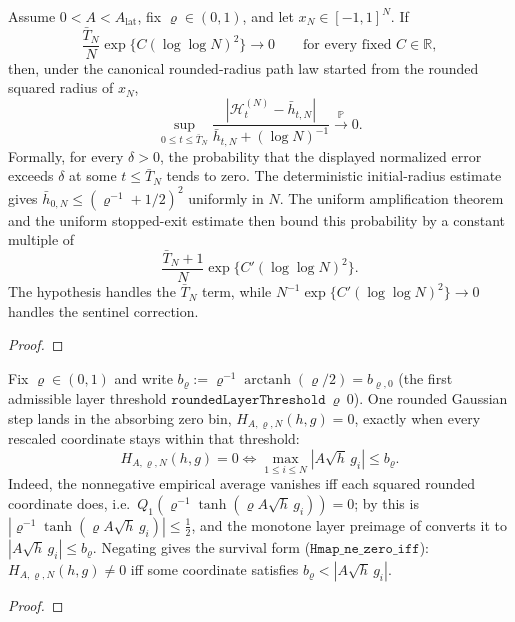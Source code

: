 \begin{proposition}
  \label{prop:subcritical-exact-radius-concentration}
  \leanok
  Assume $0<A<A_{\mathrm{lat}}$, fix $\varrho\in(0,1)$, and let
  $x_N\in[-1,1]^N$.  If
  \[
    \frac{\bar T_N}{N}\exp\{C(\log\log N)^2\}\longrightarrow0
    \qquad\text{for every fixed }C\in\mathbb R,
  \]
  then, under the canonical rounded-radius path law started from the rounded
  squared radius of $x_N$,
  \[
    \sup_{0\leq t\leq\bar T_N}
    \frac{|\mathscr H_t^{(N)}-\bar h_{t,N}|}
      {\bar h_{t,N}+(\log N)^{-1}}
    \xrightarrow{\mathbb P}0.
  \]
  Formally, for every $\delta>0$, the probability that the displayed
  normalized error exceeds $\delta$ at some $t\leq\bar T_N$ tends to zero.
  The deterministic initial-radius estimate gives
  $\bar h_{0,N}\leq(\varrho^{-1}+1/2)^2$ uniformly in $N$.  The uniform
  amplification theorem and the uniform stopped-exit estimate then bound this
  probability by a constant multiple of
  \[
    \frac{\bar T_N+1}{N}
      \exp\{C'(\log\log N)^2\}.
  \]
  The hypothesis handles the $\bar T_N$ term, while
  $N^{-1}\exp\{C'(\log\log N)^2\}\to0$ handles the sentinel correction.
\end{proposition}
\begin{proof}
  \leanok
\end{proof}

\begin{lemma}
  \label{lem:subcritical-exact-zero-bin}
  \leanok
  Fix $\varrho\in(0,1)$ and write
  $b_\varrho:=\varrho^{-1}\operatorname{arctanh}(\varrho/2)=
  b_{\varrho,0}$ (the first admissible layer threshold
  $\texttt{roundedLayerThreshold}\ \varrho\ 0$).  One rounded Gaussian step lands in
  the absorbing zero bin, $H_{A,\varrho,N}(h,g)=0$, exactly when every rescaled
  coordinate stays within that threshold:
  \[
    H_{A,\varrho,N}(h,g)=0
    \iff
    \max_{1\leq i\leq N}|A\sqrt h\,g_i|\leq b_\varrho .
  \]
  Indeed, the nonnegative empirical average vanishes iff each squared rounded
  coordinate does, i.e.\ $Q_1(\varrho^{-1}\tanh(\varrho A\sqrt h\,g_i))=0$; by
   this is
  $|\varrho^{-1}\tanh(\varrho A\sqrt h\,g_i)|\leq\tfrac12$, and the monotone layer
  preimage of  converts it to
  $|A\sqrt h\,g_i|\leq b_\varrho$.  Negating gives the survival form
  ($\texttt{Hmap\_ne\_zero\_iff}$): $H_{A,\varrho,N}(h,g)\neq0$ iff some coordinate
  satisfies $b_\varrho<|A\sqrt h\,g_i|$.
\end{lemma}
\begin{proof}\leanok{}\end{proof}

